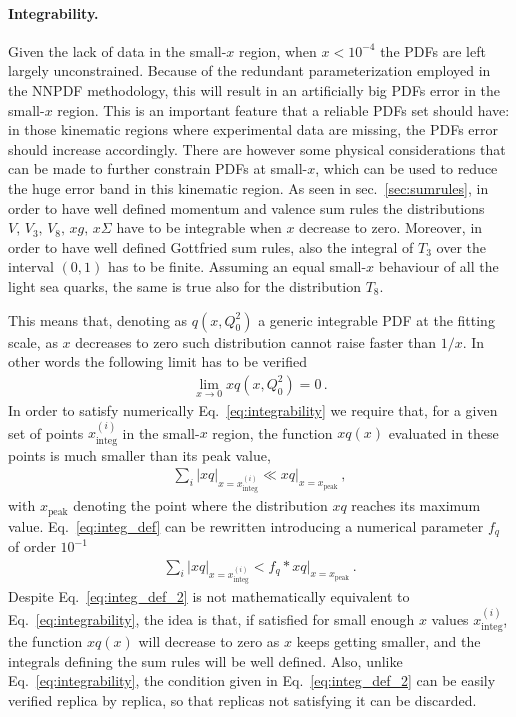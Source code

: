 \paragraph{Integrability.}
Given the lack of data in the small-$x$ region, when $x<10^{-4}$ the PDFs are left largely unconstrained. 
Because of the redundant parameterization employed in the NNPDF methodology, this will result in 
an artificially big PDFs error in the small-$x$ region.
This is an important feature that a reliable PDFs set should have: in those kinematic regions where experimental data
are missing, the PDFs error should increase accordingly.
There are however some physical considerations that can be made to further constrain PDFs at small-$x$, 
which can be used to reduce the huge error band in this kinematic region. 
As seen in sec.~\ref{sec:sumrules}, in order to have well defined momentum and valence sum rules
the distributions $V,\, V_3,\, V_8,\, xg,\, x\Sigma$ have to be integrable when $x$ decrease to zero.
Moreover, in order to have well defined Gottfried sum rules, also the integral of $T_3$ over the interval
$\left(0,1\right)$ has to be finite. 
Assuming an equal small-$x$ behaviour of all the light sea quarks, the same is true also for the distribution $T_8$.

This means that, denoting as $q\left(x,Q_0^2\right)$ a generic integrable PDF at the fitting scale, as $x$ decreases to zero
such distribution cannot raise faster than $1/x$. In other words the following limit has to be verified
\begin{align}
    \label{eq:integrability}
    \lim_{x\rightarrow 0} xq\left(x,Q_0^2\right) = 0\,.
\end{align}
%
In order to satisfy numerically Eq.~\eqref{eq:integrability}
we require that, for a given set of points $x^{(i)}_{\text{integ}}$ in the small-$x$ region,
the function $xq\left(x\right)$ evaluated in these points is much smaller than its peak value,
\begin{align}
    \label{eq:integ_def}
    \sum_i|xq|_{x=x^{(i)}_{\text{integ}}} \ll xq|_{x=x_{\text{peak}}}\,,
\end{align}
with $x_{\text{peak}}$ denoting the point where the distribution $xq$ reaches its maximum value.
Eq.~\eqref{eq:integ_def} can be rewritten introducing a numerical parameter $f_q$ of order $10^{-1}$
\begin{align}
    \label{eq:integ_def_2}
    \sum_i|xq|_{x=x^{(i)}_{\text{integ}}} < f_q*xq|_{x=x_{\text{peak}}}\,.
\end{align}
Despite Eq.~\eqref{eq:integ_def_2} is not mathematically equivalent to Eq.~\eqref{eq:integrability},
 the idea is that,
if satisfied for small enough $x$ values $x^{(i)}_{\text{integ}}$, the function $xq\left(x\right)$ will 
decrease to zero as $x$ keeps getting smaller, and the integrals defining the sum rules will be 
well defined. Also, unlike Eq.~\eqref{eq:integrability}, the condition given
in Eq.~\eqref{eq:integ_def_2} can be easily verified replica by replica, so that replicas not satisfying it
can be discarded.


